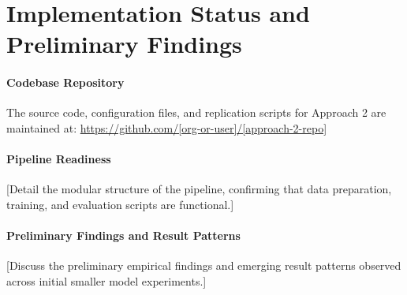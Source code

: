 \section{Implementation Status and Preliminary Findings}
\label{sec:app2_implementation_findings}


\paragraph{Codebase Repository}
The source code, configuration files, and replication scripts for Approach 2 are maintained at:
\url{https://github.com/[org-or-user]/[approach-2-repo]}

\paragraph{Pipeline Readiness}
[Detail the modular structure of the pipeline, confirming that data preparation, training, and evaluation scripts are functional.]

\paragraph{Preliminary Findings and Result Patterns}
[Discuss the preliminary empirical findings and emerging result patterns observed across initial smaller model experiments.]
